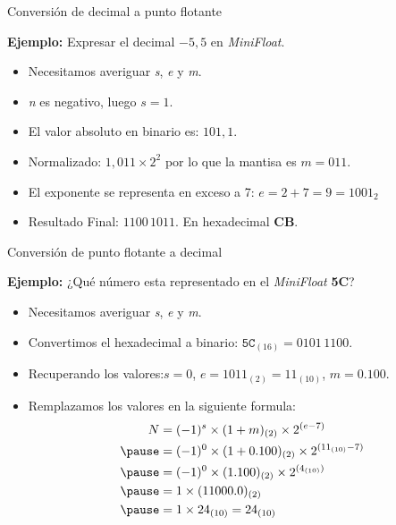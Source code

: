 \documentclass[11pt,a4paper,spanish]{beamer}
\begin{document}
\begin{frame}{Conversión de decimal a punto flotante}

\textbf{Ejemplo:} Expresar el decimal $-5,5$ en \emph{MiniFloat}.

\begin{itemize}
    \item Necesitamos averiguar \textit{s}, \textit{e} y \textit{m}.
    \pause
    \item \textit{n} es negativo, luego $s = 1$. \pause
    \item El valor absoluto en binario es: $101,1$. \pause
    \item Normalizado: $1,011 \times 2^2$  por lo que la mantisa es $m=011$.
        \pause
    \item El exponente se representa en exceso a 7: $e = 2 + 7 = 9 = 1001_{2}$
        \pause
    \item Resultado Final: $1100\,1011$. En hexadecimal \textbf{CB}.
\end{itemize}
\end{frame}

\begin{frame}{Conversión de punto flotante a decimal}

\textbf{Ejemplo:} ¿Qué número esta representado en el \emph{MiniFloat}
    \textbf{5C}?

\begin{itemize}
    \item Necesitamos averiguar \textit{s}, \textit{e} y \textit{m}.
    \pause
    \item Convertimos el hexadecimal a binario: $\mathtt{5C}_{(16)} =
        0101\,1100$. \pause
    \item Recuperando los valores:$s = 0$, $e = 1011_{(2)} = 11_{(10)}$,
        $m = 0.100$. \pause
    \item Remplazamos los valores en la siguiente formula:
    \begin{equation*}
    \begin{aligned}
        N &= (-1)^{s} \times (1+m)_{(2)}\times 2^{(e-7)}\\
        \pause
          &= (-1)^{0} \times (1+0.100)_{(2)}\times 2^{(11_{(10)}-7)}\\
        \pause
          &= (-1)^{0} \times (1.100)_{(2)}\times 2^{(4_{(10)})}\\
        \pause
          &= 1 \times (11000.0)_{(2)}\\
        \pause
          &= 1 \times 24_{(10)} = 24_{(10)}
    \end{aligned}
    \end{equation*}
\end{itemize}
\end{frame}
\end{document}
